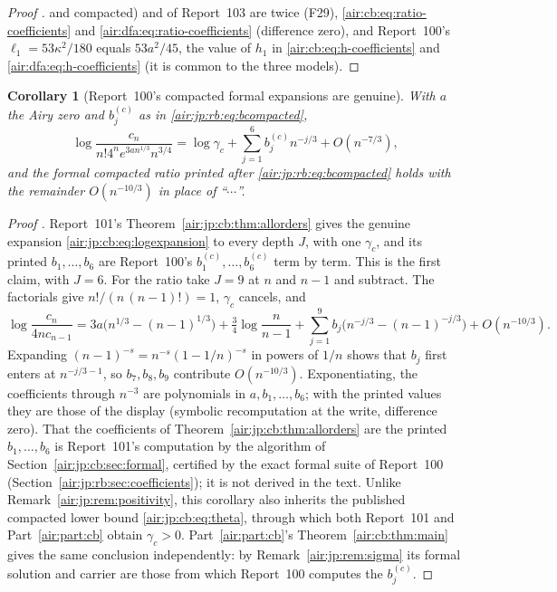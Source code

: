 \documentclass[11pt,letterpaper]{article}
\numberwithin{equation}{section}
\newtheorem{corollary}[theorem]{Corollary}
\theoremstyle{remark}
\begin{document}
\begin{proof}[Proof {\normalfont[write]}]
and compacted) and of Report~103 are twice (F29), \eqref{air:cb:eq:ratio-coefficients} and \eqref{air:dfa:eq:ratio-coefficients} (difference zero), and Report~100's $\ell_1=53\kappa^2/180$ equals $53a^2/45$, the value of $h_1$ in \eqref{air:cb:eq:h-coefficients} and \eqref{air:dfa:eq:h-coefficients} (it is common to the three models).
\end{proof}

\begin{corollary}[Report~100's compacted formal expansions are genuine]\label{air:jp:cor:compacted}
With $a$ the Airy zero and $b_j^{(c)}$ as in \eqref{air:jp:rb:eq:bcompacted},
\[
 \log\frac{c_n}{n!4^ne^{3an^{1/3}}n^{3/4}}=\log\gamma_c+\sum_{j=1}^6b_j^{(c)}n^{-j/3}+O(n^{-7/3}),
\]
and the formal compacted ratio printed after \eqref{air:jp:rb:eq:bcompacted} holds with the remainder $O(n^{-10/3})$ in place of ``$\cdots$''.
\end{corollary}
\begin{proof}[Proof {\normalfont[write]}]
Report~101's Theorem~\ref{air:jp:cb:thm:allorders} gives the genuine expansion \eqref{air:jp:cb:eq:logexpansion} to every depth $J$, with one $\gamma_c$, and its printed $b_1,\ldots,b_6$ are Report~100's $b^{(c)}_1,\ldots,b^{(c)}_6$ term by term. This is the first claim, with $J=6$. For the ratio take $J=9$ at $n$ and $n-1$ and subtract. The factorials give $n!/(n\,(n-1)!)=1$, $\gamma_c$ cancels, and
\[
 \log\frac{c_n}{4nc_{n-1}}=3a\bigl(n^{1/3}-(n-1)^{1/3}\bigr)+\tfrac34\log\frac n{n-1}+\sum_{j=1}^9b_j\bigl(n^{-j/3}-(n-1)^{-j/3}\bigr)+O(n^{-10/3}).
\]
Expanding $(n-1)^{-s}=n^{-s}(1-1/n)^{-s}$ in powers of $1/n$ shows that $b_j$ first enters at $n^{-j/3-1}$, so $b_7,b_8,b_9$ contribute $O(n^{-10/3})$. Exponentiating, the coefficients through $n^{-3}$ are polynomials in $a,b_1,\ldots,b_6$; with the printed values they are those of the display (symbolic recomputation at the write, difference zero). That the coefficients of Theorem~\ref{air:jp:cb:thm:allorders} are the printed $b_1,\ldots,b_6$ is Report~101's computation by the algorithm of Section~\ref{air:jp:cb:sec:formal}, certified by the exact formal suite of Report~100 (Section~\ref{air:jp:rb:sec:coefficients}); it is not derived in the text. Unlike Remark~\ref{air:jp:rem:positivity}, this corollary also inherits the published compacted lower bound \eqref{air:jp:cb:eq:theta}, through which both Report~101 and Part~\ref{air:part:cb} obtain $\gamma_c>0$. Part~\ref{air:part:cb}'s Theorem~\ref{air:cb:thm:main} gives the same conclusion independently: by Remark~\ref{air:jp:rem:sigma} its formal solution and carrier are those from which Report~100 computes the $b^{(c)}_j$.
\end{proof}
\end{document}

